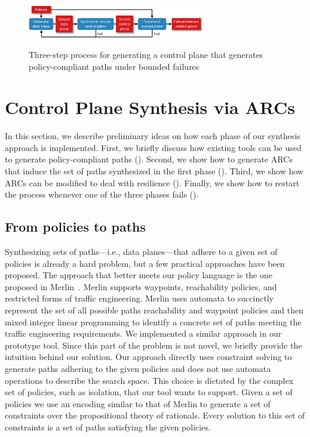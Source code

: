 \begin{figure}
\centering
\includegraphics[width=0.7\textwidth]{figures/process.pdf}
\label{fig:process}
\caption{Three-step process for generating a control plane that generates
    policy-compliant paths under bounded failures}
\end{figure}

\section{Control Plane Synthesis via ARCs} \label{sec:synthesis}
In this section, we describe preliminary ideas on how each phase of our synthesis 
approach is implemented.
First, we briefly discuss how existing tools can be used to generate
policy-compliant paths ().
Second, we show how to generate ARCs that induce
the set of paths synthesized in the first phase ().
Third, we show how ARCs can be modified to deal with resilience ().
Finally, we show how to restart the process whenever one of the three phases fails ().

\subsection{From policies to paths}
Synthesizing sets of paths---i.e., data planes---that adhere to a given set of policies
is already a hard problem, but a few practical approaches have been proposed.
The approach that better meets our policy language is the one proposed in Merlin~\cite{}.
Merlin supports waypoints, reachability policies, and restricted forms of traffic engineering. 
Merlin uses automata to succinctly represent
the set of all possible paths reachability and waypoint policies and then mixed integer linear programming
to identify a concrete set of paths meeting the traffic engineering requirements.
We implemented a similar approach in our prototype tool. 
Since this part of the problem is not novel, we briefly provide the intuition behind our solution.
Our approach directly uses  constraint solving to generate paths adhering to the given policies and does 
not use automata operations to describe the search space. This choice is dictated by the complex set of policies, such as isolation,
that our tool wants to support. 
Given a set of policies we 
use an encoding similar to that of Merlin to generate a set of constraints over the propositional theory of
rationals. Every solution to this set of constraints is a set of paths satisfying the given policies.

